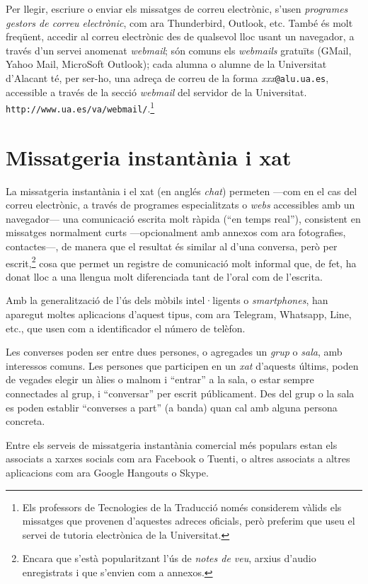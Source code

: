 Per llegir, escriure o enviar els missatges de correu electrònic,
s'usen \emph{programes gestors de correu electrònic}, com ara
Thunderbird, Outlook, etc.  També és molt freqüent, accedir al correu
electrònic des de qualsevol lloc usant un navegador, a través d'un
servei anomenat \emph{webmail}; són comuns els \emph{webmails}
gratuïts (GMail, Yahoo Mail, MicroSoft Outlook); cada alumna o alumne
de la Universitat d'Alacant té, per ser-ho, una adreça de correu de la
forma \emph{xxx}\texttt{@alu.ua.es}, accessible a través de la secció
\emph{webmail} del servidor de la Universitat.
\texttt{http://www.ua.es/va/webmail/}.\footnote{Els professors de
  Tecnologies de la Traducció només considerem vàlids els missatges
  que provenen d'aquestes adreces oficials, però preferim que useu el
  servei de tutoria electrònica de la Universitat.}

\section{Missatgeria instantània i xat}
\label{ss:missinst}
La missatgeria instantània i el xat (en anglés \emph{chat}) permeten
---com en el cas del correu electrònic, a través de programes
especialitzats o \emph{webs} accessibles amb un navegador--- una
comunicació escrita molt ràpida (``en temps real''), consistent en
missatges normalment curts ---opcionalment amb annexos com ara
fotografies, contactes---, de manera que el resultat és similar al
d'una conversa, però per escrit,\footnote{Encara que s'està
  popularitzant l'ús de \emph{notes de veu}, arxius d'audio
  enregistrats i que s'envien com a annexos.} cosa que permet un registre
de comunicació molt informal que, de fet, ha donat lloc a una llengua molt
diferenciada tant de l'oral com de l'escrita.

Amb la generalització de l'ús dels mòbils intel·ligents o
\emph{smartphones}, han aparegut moltes aplicacions d'aquest tipus,
com ara Telegram, Whatsapp, Line, etc., que usen com a identificador
el número de telèfon. 

Les converses poden ser entre dues persones, o agregades un
\emph{grup} o \emph{sala}, amb interessos comuns.  Les persones que
participen en un \emph{xat} d'aquests últims, poden de vegades elegir
un àlies o malnom i ``entrar'' a la sala, o estar sempre connectades
al grup, i ``conversar'' per escrit públicament. Des del grup o la
sala es poden establir ``converses a part'' (a banda) quan cal amb
alguna persona concreta.

Entre els serveis de missatgeria instantània comercial més populars
estan els associats a xarxes socials com ara Facebook o Tuenti, o altres
associats a altres aplicacions com ara Google Hangouts o Skype.

